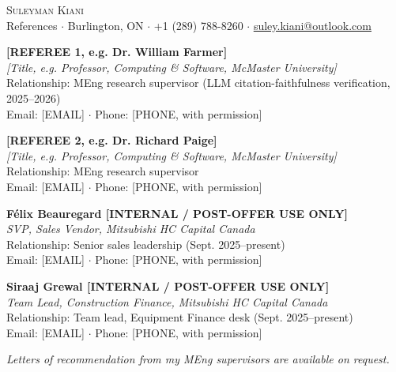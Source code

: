 \documentclass[letterpaper,11pt]{article}
\begin{document}
\begin{center}
    {\Huge \scshape Suleyman Kiani} \\ \vspace{3pt}
    \small References $\cdot$ Burlington, ON $\cdot$ +1 (289) 788-8260 $\cdot$ \href{mailto:suley.kiani@outlook.com}{\underline{suley.kiani@outlook.com}}
\end{center}

\vspace{14pt}

\textbf{[REFEREE 1, e.g. Dr. William Farmer]} \\
\textit{[Title, e.g. Professor, Computing \& Software, McMaster University]} \\
Relationship: MEng research supervisor (LLM citation-faithfulness verification, 2025--2026) \\
Email: [EMAIL] $\cdot$ Phone: [PHONE, with permission]

\vspace{10pt}

\textbf{[REFEREE 2, e.g. Dr. Richard Paige]} \\
\textit{[Title, e.g. Professor, Computing \& Software, McMaster University]} \\
Relationship: MEng research supervisor \\
Email: [EMAIL] $\cdot$ Phone: [PHONE, with permission]

\vspace{10pt}

\textbf{F\'elix Beauregard [INTERNAL / POST-OFFER USE ONLY]} \\
\textit{SVP, Sales Vendor, Mitsubishi HC Capital Canada} \\
Relationship: Senior sales leadership (Sept. 2025--present) \\
Email: [EMAIL] $\cdot$ Phone: [PHONE, with permission]

\vspace{10pt}

\textbf{Siraaj Grewal [INTERNAL / POST-OFFER USE ONLY]} \\
\textit{Team Lead, Construction Finance, Mitsubishi HC Capital Canada} \\
Relationship: Team lead, Equipment Finance desk (Sept. 2025--present) \\
Email: [EMAIL] $\cdot$ Phone: [PHONE, with permission]

\vspace{14pt}

\small\textit{Letters of recommendation from my MEng supervisors are available on request.}
\end{document}

